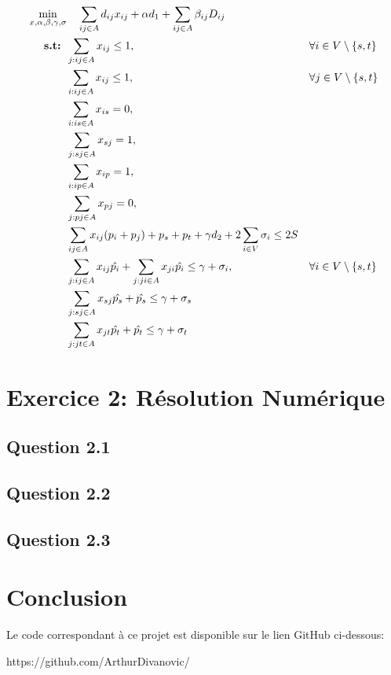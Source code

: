\documentclass{article}
\begin{document}
\begin{align}
  \min_{x, \alpha, \beta, \gamma, \sigma} & \ \ \ \sum_{ij \in A} d_{ij} x_{ij} + \alpha d_1 + \sum_{ij \in A} \beta_{ij} D_{ij} && \notag \\
  \textbf{s.t: }  &\sum_{j: ij \in A} x_{ij} \leq 1, && \forall i \in V \setminus{\{s,t\}} \notag \\
  &\sum_{i: ij \in A} x_{ij} \leq 1, && \forall j \in V \setminus{\{s,t\}} \notag\\
  &\sum_{i: is \in A} x_{is} = 0, \notag \\
  &\sum_{j: sj \in A} x_{sj} = 1, \notag \\
  &\sum_{i: ip \in A} x_{ip} = 1, \notag \\
  &\sum_{j: pj \in A} x_{pj} = 0, \notag \\
  &\sum_{ij \in A} x_{ij} (p_i + p_j) + p_s + p_t + \gamma d_2 + 2 \sum_{i \in V} \sigma_i  \leq 2S \notag \\
  & \sum_{j: ij \in A} x_{ij} \hat{p_i} + \sum_{j: ji \in A} x_{ji} \hat{p_i} \leq \gamma + \sigma_i, && \forall i \in V \setminus{\{s,t\}} \\
  & \sum_{j: sj \in A} x_{sj} \hat{p_s} + \hat{p_s} \leq \gamma + \sigma_s \\
  & \sum_{j: jt \in A} x_{jt} \hat{p_t} + \hat{p_t} \leq \gamma + \sigma_t
\end{align}



\newpage

\section{Exercice 2: Résolution Numérique}

\subsection{Question 2.1}

\subsection{Question 2.2}

\subsection{Question 2.3}




\newpage
\section*{Conclusion}



\vspace{2cm}
Le code correspondant à ce projet est disponible sur le lien GitHub ci-dessous:
\\
\begin{center}
https://github.com/ArthurDivanovic/
\end{center}



\newpage

% 
\end{document}
